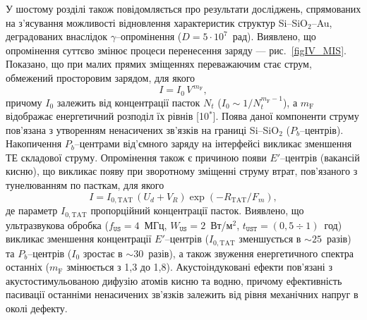 У шостому розділі також повідомляється про результати досліджень, спрямованих на з'ясування можливості відновлення характеристик структур Si--SiO$_2$--Au,
деградованих внаслідок $\gamma$--опромінення ($D=5\cdot10^7$~рад).
Виявлено, що опромінення суттєво змінює процеси перенесення заряду --- рис.~\ref{figIV_MIS}.
Показано, що при малих прямих зміщеннях переважаючим стає струм, обмежений просторовим зарядом, для якого
\begin{equation}\label{eqVIsclc}
  I=I_0\,V^{\,m_\mathrm{F}},
\end{equation}
причому $I_0$ залежить від концентрації пасток $N_t$ ($I_0\sim 1/N_t^{m_\mathrm{F}-1}$),
а $m_\mathrm{F}$ відображає енергетичний розподіл їх рівнів
[10$^*$].
Поява даної компоненти струму пов'язана з утворенням ненасичених зв'язків на границі Si--SiO$_2$ ($P_b$--центрів).
Накопичення $P_b$--центрами від'ємного заряду на інтерфейсі викликає зменшення ТЕ складової струму.
Опромінення також є причиною появи $E'$--центрів (вакансій кисню), що
викликає появу при зворотному зміщенні струму втрат, пов'язаного з тунелюванням по пасткам, для якого
\begin{equation}\label{eqIVTAT}
  I=I_{0,\mathrm{TAT}}\,(U_d+V_R)\exp\left(-R_\mathrm{TAT}/F_m\right),
\end{equation}
де параметр $I_{0,\mathrm{TAT}}$ пропорційний концентрації пасток.
Виявлено, що
ультразвукова обробка
($f_\mathtt{US}=4$~МГц, $W_\mathtt{US}=2$~Вт/м$^2$, $t_\mathtt{UST}=(0,5\div1)$~год) викликає зменшення концентрації
$E'$--центрів ($I_{0,\mathrm{TAT}}$ зменшується в $\sim25$~разів) та  $P_b$--центрів ($I_0$ зростає в $\sim30$~разів),
а також звуження енергетичного спектра останніх ($m_\mathrm{F}$ змінюється з 1,3 до 1,8).
Акустоіндуковані ефекти пов'язані з акустостимульованою дифузію  атомів кисню та водню, причому ефективність пасивації останніми ненасичених зв'язків залежить
від рівня механічних напруг в околі дефекту.



